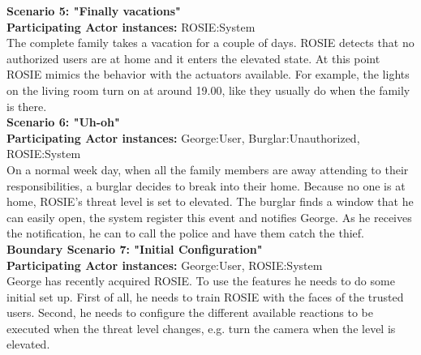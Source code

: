 \textbf{Scenario 5: "Finally vacations"} \\
\textbf{Participating Actor instances:} ROSIE:System\\
The complete family takes a vacation for a couple of days. ROSIE detects that no authorized users are at home and it enters the elevated state. At this point ROSIE mimics the behavior with the actuators available. For example, the lights on the living room turn on at around 19.00, like they usually do when the family is there. \\

\textbf{Scenario 6: "Uh-oh"} \\
\textbf{Participating Actor instances:} George:User, Burglar:Unauthorized, ROSIE:System\\
On a normal week day, when all the family members are away attending to their responsibilities, a burglar decides to break into their home. Because no one is at home, ROSIE's threat level is set to elevated. The burglar finds a window that he can easily open, the system register this event and notifies George. As he receives the notification, he can to call the police and have them catch the thief. \\

\textbf{Boundary Scenario 7: "Initial Configuration"} \\
\textbf{Participating Actor instances:} George:User, ROSIE:System\\
George has recently acquired ROSIE. To use the features he needs to do some initial set up. First of all, he needs to train ROSIE with the faces of the trusted users. Second, he needs to configure the different available reactions to be executed when the threat level changes, e.g. turn the camera when the level is elevated.

